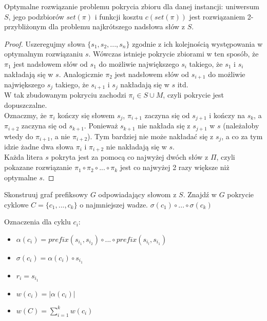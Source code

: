 \begin{lemma}
\label{superstring_cover}
Optymalne rozwiązanie problemu pokrycia zbioru dla danej instancji: uniwersum $S$, jego podzbiorów $set(\pi)$ i funkcji kosztu $c(set(\pi))$ jest rozwiązaniem 2-przybliżonym dla problemu najkrótszego nadsłowa słów z $S$.
\end{lemma}
\begin{proof}
Uszeregujmy słowa $\{s_1, s_2, ..., s_n\}$ zgodnie z ich kolejnością występowania w optymalnym rozwiązaniu $s$. Wówczas istnieje pokrycie zbiorami w ten sposób, że $\pi_1$ jest nadsłowem słów od $s_1$ do możliwie największego $s_i$ takiego, że $s_1$ i $s_i$ nakładają się w $s$. Analogicznie $\pi_2$ jest nadsłowem słów od $s_{i+1}$ do możliwie największego $s_j$ takiego, że $s_{i+1}$ i $s_j$ nakładają się w $s$ itd. \\
W tak zbudowanym pokryciu zachodzi $\pi_i \in S \cup M$, czyli pokrycie jest dopuszczalne. \\
Oznaczmy, że $\pi_i$ kończy się słowem $s_j$, $\pi_{i+1}$ zaczyna się od $s_{j+1}$ i kończy na $s_k$, a $\pi_{i+2}$ zaczyna się od $s_{k+1}$. Ponieważ $s_{k+1}$ nie nakłada się z $s_{j+1}$ w $s$ (należałoby wtedy do $\pi_{i+1}$, a nie $\pi_{i+2}$). Tym bardziej nie może nakładać się z $s_j$, a co za tym idzie żadne dwa słowa $\pi_i$ i $\pi_{i+2}$ nie nakładają się w $s$. \\
Każda litera $s$ pokryta jest za pomocą co najwyżej dwóch słów z $\Pi$, czyli pokazane rozwiązanie $\pi_1 \circ \pi_2 \circ ... \circ \pi_k$ jest co najwyżej 2 razy większe niż optymalne $s$.
\end{proof}

\begin{algorithm}
\caption{}
\label{4-APX_shortest_superstring}
\begin{algorithmic}
\State Skonstruuj graf prefiksowy $G$ odpowiadający słowom z $S$.
\State Znajdź w $G$ pokrycie cyklowe $C = \{c_1, ..., c_k\}$ o najmniejszej wadze.
\Return $\sigma(c_1) \circ ... \circ \sigma(c_k)$
\end{algorithmic}
\end{algorithm}

\begin{remark}
Oznaczenia dla cyklu $c_i$:
\begin{itemize}
\setlength{\itemsep}{1pt}
\setlength{\parskip}{0pt}
\setlength{\parsep}{0pt}
\item $\alpha(c_i) = prefix(s_{i_1}, s_{i_2}) \circ ... \circ prefix(s_{i_l}, s_{i_1})$
\item $\sigma(c_i) = \alpha(c_i) \circ s_{i_1}$
\item $r_i = s_{i_1}$
\item $w(c_i) = |\alpha(c_i)|$
\item $w(C) = \sum\limits_{i = 1}^k w(c_i)$
\end{itemize}
\end{remark}

